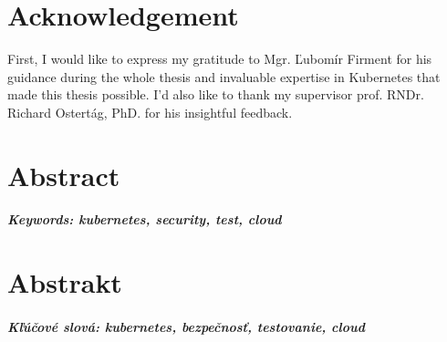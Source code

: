 \documentclass[12pt, oneside, openany]{book}
\begin{document}
\newpage
\thispagestyle{empty}
\chapter*{Acknowledgement}\label{chap:thank_you}
First, I would like to express my gratitude to Mgr. Ľubomír Firment for his guidance during the whole thesis and invaluable expertise in Kubernetes that made this thesis possible. I'd also like to thank my supervisor prof. RNDr. Richard Ostertág, PhD. for his insightful feedback.


\vfill\eject 



\newpage 
\thispagestyle{empty}
\chapter*{Abstract}\label{chap:abstract_en}


\paragraph*{Keywords: kubernetes, security, test, cloud}  


\newpage 
\thispagestyle{empty}
\chapter*{Abstrakt}\label{chap:abstract_sk}


\paragraph*{Kľúčové slová: kubernetes, bezpečnosť, testovanie, cloud}




\newpage 
\tableofcontents



\newpage 
\listoffigures
\listoftables




\mainmatter


% 
% 
% 
% 
% 
% 
% 
% 
% 





\backmatter

\nocite{*}



\end{document}
